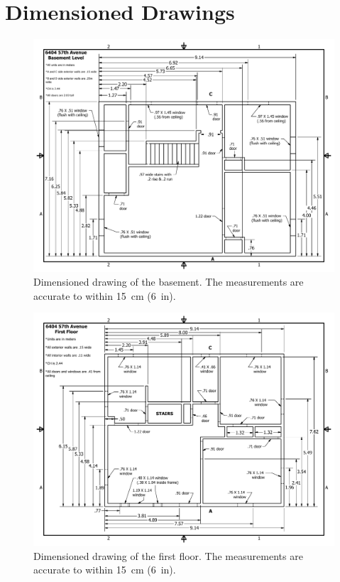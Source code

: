 \documentclass[12pt,oneside]{book}
\begin{document}


\appendix

\chapter{Dimensioned Drawings}
\label{app_draw}

\begin{figure}[!ht]
\centering
\includegraphics[width=1\textwidth]{../Figures/Basement_Metric}
\caption[Dimensioned drawing of first floor.]{Dimensioned drawing of the basement. The measurements are accurate to within 15~cm (6~in).}
\label{fig:basement}
\end{figure}

\begin{figure}[!ht]
\centering
\includegraphics[width=1\textwidth]{../Figures/First_Floor_Metric}
\caption[Dimensioned drawing of second floor.]{Dimensioned drawing of the first floor. The measurements are accurate to within 15~cm (6~in).}
\label{fig:first_floor}
\end{figure}
\end{document}
